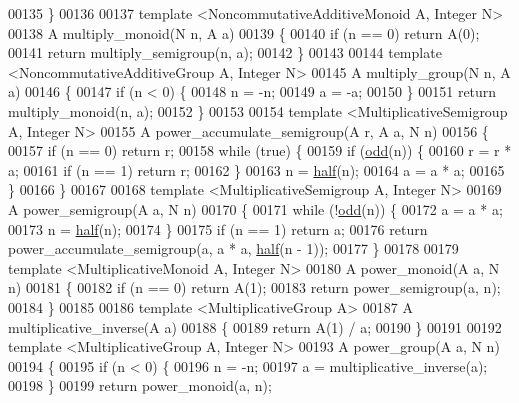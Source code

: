 \begin{DoxyCode}
00135 \}
00136 
00137 \textcolor{keyword}{template} <NoncommutativeAdditiveMono\textcolor{keywordtype}{id} A, Integer N>
00138 A multiply\_monoid(N n, A a)
00139 \{
00140   \textcolor{keywordflow}{if} (n == 0) \textcolor{keywordflow}{return} A(0);
00141   \textcolor{keywordflow}{return} multiply\_semigroup(n, a);
00142 \}
00143 
00144 \textcolor{keyword}{template} <NoncommutativeAdditiveGroup A, Integer N>
00145 A multiply\_group(N n, A a)
00146 \{
00147   \textcolor{keywordflow}{if} (n < 0) \{
00148     n = -n;
00149     a = -a;
00150   \}
00151   \textcolor{keywordflow}{return} multiply\_monoid(n, a);
00152 \}
00153 
00154 \textcolor{keyword}{template} <MultiplicativeSemigroup A, Integer N>
00155 A power\_accumulate\_semigroup(A r, A a, N n)
00156 \{
00157   \textcolor{keywordflow}{if} (n == 0) \textcolor{keywordflow}{return} r;
00158   \textcolor{keywordflow}{while} (\textcolor{keyword}{true}) \{
00159     \textcolor{keywordflow}{if} (\hyperlink{ch07_8hpp_a77588a29d6eeebc52834d05039b7f83f}{odd}(n)) \{
00160       r = r * a;
00161       \textcolor{keywordflow}{if} (n == 1) \textcolor{keywordflow}{return} r;
00162     \}
00163     n = \hyperlink{ch07_8hpp_a5c310c077a590421ce629a0a40d6b841}{half}(n);
00164     a = a * a;
00165   \}
00166 \}
00167 
00168 \textcolor{keyword}{template} <MultiplicativeSemigroup A, Integer N>
00169 A power\_semigroup(A a, N n)
00170 \{
00171   \textcolor{keywordflow}{while} (!\hyperlink{ch07_8hpp_a77588a29d6eeebc52834d05039b7f83f}{odd}(n)) \{
00172     a = a * a;
00173     n = \hyperlink{ch07_8hpp_a5c310c077a590421ce629a0a40d6b841}{half}(n);
00174   \}
00175   \textcolor{keywordflow}{if} (n == 1) \textcolor{keywordflow}{return} a;
00176   \textcolor{keywordflow}{return} power\_accumulate\_semigroup(a, a * a, \hyperlink{ch07_8hpp_a5c310c077a590421ce629a0a40d6b841}{half}(n - 1));
00177 \}
00178 
00179 \textcolor{keyword}{template} <MultiplicativeMono\textcolor{keywordtype}{id} A, Integer N>
00180 A power\_monoid(A a, N n)
00181 \{
00182   \textcolor{keywordflow}{if} (n == 0) \textcolor{keywordflow}{return} A(1);
00183   \textcolor{keywordflow}{return} power\_semigroup(a, n);
00184 \}
00185 
00186 \textcolor{keyword}{template} <MultiplicativeGroup A>
00187 A multiplicative\_inverse(A a)
00188 \{
00189   \textcolor{keywordflow}{return} A(1) / a;
00190 \}
00191 
00192 \textcolor{keyword}{template} <MultiplicativeGroup A, Integer N>
00193 A power\_group(A a, N n)
00194 \{
00195   \textcolor{keywordflow}{if} (n < 0) \{
00196     n = -n;
00197     a = multiplicative\_inverse(a);
00198   \}
00199   \textcolor{keywordflow}{return} power\_monoid(a, n);

\end{DoxyCode}
